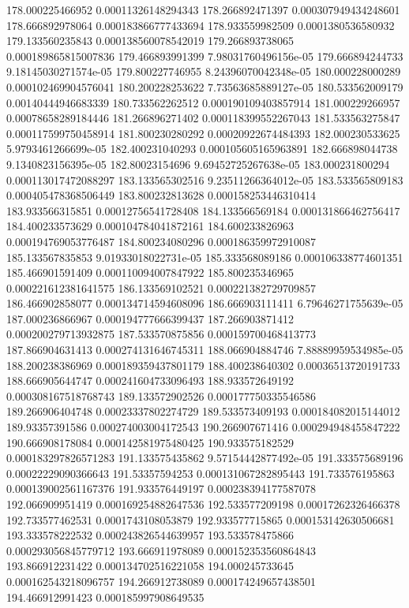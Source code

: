 {178.000225466952 0.00011326148294343
178.266892471397 0.000307949434248601
178.666892978064 0.000183866777433694
178.933559982509 0.0001380536580932
179.133560235843 0.000138560078542019
179.266893738065 0.000189865815007836
179.466893991399 7.98031760496156e-05
179.666894244733 9.18145030271574e-05
179.800227746955 8.24396070042348e-05
180.000228000289 0.000102469904576041
180.200228253622 7.73563685889127e-05
180.533562009179 0.00140444946683339
180.733562262512 0.000190109403857914
181.000229266957 0.00078658289184446
181.266896271402 0.000118399552267043
181.533563275847 0.000117599750458914
181.800230280292 0.00020922674484393
182.000230533625 5.9793461266699e-05
182.400231040293 0.000105605165963891
182.666898044738 9.1340823156395e-05
182.80023154696 9.69452725267638e-05
183.000231800294 0.000113017472088297
183.133565302516 9.23511266364012e-05
183.533565809183 0.000405478368506449
183.800232813628 0.000158253446310414
183.933566315851 0.00012756541728408
184.133566569184 0.000131866462756417
184.400233573629 0.000104784041872161
184.600233826963 0.000194769053776487
184.800234080296 0.000186359972910087
185.133567835853 9.01933018022731e-05
185.333568089186 0.000106338774601351
185.466901591409 0.000110094007847922
185.800235346965 0.000221612381641575
186.133569102521 0.000221382729709857
186.466902858077 0.000134714594608096
186.666903111411 6.79646271755639e-05
187.000236866967 0.000194777666399437
187.266903871412 0.000200279713932875
187.533570875856 0.000159700468413773
187.866904631413 0.000274131646745311
188.066904884746 7.88889959534985e-05
188.200238386969 0.000189359437801179
188.400238640302 0.00036513720191733
188.666905644747 0.000241604733096493
188.933572649192 0.000308167518768743
189.133572902526 0.000177750335546586
189.266906404748 0.00023337802274729
189.533573409193 0.000184082015144012
189.93357391586 0.000274003004172543
190.266907671416 0.000294948455847222
190.666908178084 0.000142581975480425
190.933575182529 0.000183297826571283
191.133575435862 9.57154442877492e-05
191.333575689196 0.00022229090366643
191.53357594253 0.000131067282895443
191.733576195863 0.000139002561167376
191.933576449197 0.000238394177587078
192.066909951419 0.000169254882647536
192.533577209198 0.00017262326466378
192.733577462531 0.0001743108053879
192.933577715865 0.000153142630506681
193.333578222532 0.000243826544639957
193.533578475866 0.000293056845779712
193.666911978089 0.000152353560864843
193.866912231422 0.000134702516221058
194.000245733645 0.000162543218096757
194.266912738089 0.000174249657438501
194.466912991423 0.000185997908649535
}
